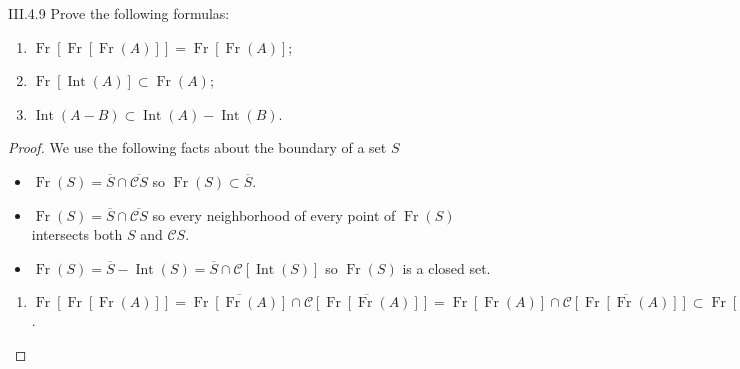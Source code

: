 \begin{problem}{III.4.9}
Prove the following formulas:
\begin{enumerate}[label={(\alph*)},itemsep=0pt]
	\item \( \operatorname{Fr}\left[ \operatorname{Fr}\left[ \operatorname{Fr}(A) \right] \right] = \operatorname{Fr}\left[ \operatorname{Fr}(A) \right] \);
	\item \( \operatorname{Fr}\left[ \operatorname{Int}(A) \right] \subset \operatorname{Fr}(A) \);
	\item \( \operatorname{Int}(A - B) \subset \operatorname{Int}(A) - \operatorname{Int}(B) \).
\end{enumerate}
\end{problem}

\begin{proof}
	We use the following facts about the boundary of a set \(S\)
	\begin{itemize}[leftmargin=*]
		\item \( \operatorname{Fr}(S) = \overline{S} \cap \overline{\mathscr{C}S} \) so \( \operatorname{Fr}(S) \subset \overline{S} \).
		\item \( \operatorname{Fr}(S) = \overline{S} \cap \overline{\mathscr{C}S} \) so every neighborhood of every point of \( \operatorname{Fr}(S) \) intersects both \( S \) and \( \mathscr{C}S \).
		\item \( \operatorname{Fr}(S) = \overline{S} - \operatorname{Int}(S) = \overline{S} \cap \mathscr{C}\left[ \operatorname{Int}(S) \right] \) so \( \operatorname{Fr}(S) \) is a closed set.
	\end{itemize}
	\begin{enumerate}[label={(\alph*)},itemsep=0pt,leftmargin=*]
		\item \( \operatorname{Fr}\left[\operatorname{Fr}\left[\operatorname{Fr}(A)\right]\right] = \overline{\operatorname{Fr}\left[\operatorname{Fr}(A)\right]} \cap \overline{\mathscr{C}\left[\operatorname{Fr}\left[\operatorname{Fr}(A)\right]\right]} = \operatorname{Fr}\left[\operatorname{Fr}(A)\right] \cap \overline{\mathscr{C}\left[\operatorname{Fr}\left[\operatorname{Fr}(A)\right]\right]} \subset \operatorname{Fr}\left[\operatorname{Fr}(A)\right] \).


\end{enumerate}
\end{proof}
